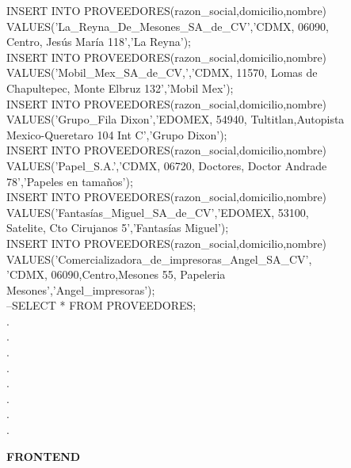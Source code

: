 \documentclass[10pt]{report}
\begin{document}
\begin{flushleft}
	INSERT INTO PROVEEDORES(razon\_social,domicilio,nombre)\\
	VALUES('La\_Reyna\_De\_Mesones\_SA\_de\_CV','CDMX, 06090,\\ Centro, Jesús María 118','La Reyna');\\
	INSERT INTO PROVEEDORES(razon\_social,domicilio,nombre)\\
	VALUES('Mobil\_Mex\_SA\_de\_CV,','CDMX, 11570, Lomas de\\ Chapultepec, Monte Elbruz 132','Mobil Mex');\\
	INSERT INTO PROVEEDORES(razon\_social,domicilio,nombre)\\
	VALUES('Grupo\_Fila Dixon','EDOMEX, 54940, Tultitlan,Autopista\\ Mexico-Queretaro 104 Int C','Grupo Dixon');\\
	INSERT INTO PROVEEDORES(razon\_social,domicilio,nombre)\\
	VALUES('Papel\_S.A.','CDMX, 06720, Doctores, Doctor Andrade\\ 78','Papeles en tamaños');\\
	INSERT INTO PROVEEDORES(razon\_social,domicilio,nombre)\\
	VALUES('Fantasías\_Miguel\_SA\_de\_CV','EDOMEX, 53100, \\
	Satelite, Cto Cirujanos 5','Fantasías Miguel');\\
	INSERT INTO PROVEEDORES(razon\_social,domicilio,nombre)\\
	VALUES('Comercializadora\_de\_impresoras\_Angel\_SA\_CV',\\
	'CDMX, 06090,Centro,Mesones 55, Papeleria\\ Mesones','Angel\_impresoras');\\
	--SELECT * FROM PROVEEDORES;\\
	
                    .\\
                    .\\
                    .\\
                    .\\
                    .\\
                    .\\
                    .\\
                    .\\
  
    \end{flushleft}
    
    {\textbf{FRONTEND}} \\
\end{document}
